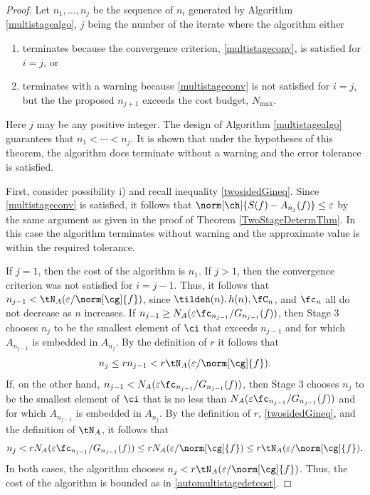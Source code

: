 \documentclass[]{elsarticle}
\theoremstyle{definition}
\theoremstyle{remark}
\begin{document}
\begin{proof} Let $n_1, \ldots, n_{j}$ be the sequence of $n_i$ generated by Algorithm \ref{multistagealgo}, $j$ being the number of the iterate where the algorithm either 
\begin{enumerate}
\renewcommand{\labelenumi}{\roman{enumi})}
\item terminates because the convergence criterion, \eqref{multistageconv}, is satisfied for $i=j$, or 

\item terminates with a warning because \eqref{multistageconv} is not satisfied for $i=j$, but the the proposed $n_{j+1}$ exceeds the cost budget, $N_{\max}$. 

\end{enumerate}
Here $j$ may be any positive integer.  The design of Algorithm \ref{multistagealgo} guarantees that $n_1 < \cdots < n_j$.  It is shown that under the hypotheses of this theorem, the algorithm does terminate without a warning and the error tolerance is satisfied.  

First, consider possibility i) and recall inequality \eqref{twosidedGineq}.
Since \eqref{multistageconv} is satisfied, it follows that $\norm[\ch]{S(f)-A_{n_j}(f)} \le \varepsilon$ by the same argument as given in the proof of Theorem \ref{TwoStageDetermThm}.  In this case the algorithm terminates without warning and the approximate value is within the required tolerance.

If $j=1$, then the cost of the algorithm is $n_1$.  If $j>1$, then the convergence criterion was not satisfied for $i=j-1$. Thus, it follows that $n_{j-1} < \tN_A(\varepsilon/\norm[\cg]{f})$, since $\tildeh(n), h(n), \fC_n$, and $\fc_n$ all do not decrease as $n$ increases. 
If $n_{j-1} \ge N_{A}(\varepsilon \fc_{n_{j-1}}/G_{n_{j-1}}(f))$, then Stage 3 chooses $n_{j}$ to be the smallest element of $\ci$ that exceeds $n_{j-1}$ and for which $A_{n_{j-1}}$ is embedded in $A_{n_j}$.  By the definition of $r$ it follows that
\begin{equation*}
n_{j} \le r  n_{j-1} < r \tN_{A}(\varepsilon/\norm[\cg]{f}).
\end{equation*}
If, on the other hand, $n_{j-1} < N_{A}(\varepsilon \fc_{n_{j-1}}/G_{n_{j-1}}(f))$, then Stage 3 chooses $n_{j}$ to be the smallest element of $\ci$ that is no less than $N_{A}(\varepsilon \fc_{n_{j-1}}/G_{n_{j-1}}(f))$ and for which $A_{n_{j-1}}$ is embedded in $A_{n_j}$.  By the definition of $r$, \eqref{twosidedGineq}, and the definition of $\tN_A$, it follows that
\begin{equation*}
n_{j} < r  N_{A}(\varepsilon \fc_{n_{j-1}}/G_{n_{j-1}}(f)) \le r  N_{A}(\varepsilon/\norm[\cg]{f}) \le r \tN_{A}(\varepsilon/\norm[\cg]{f}).
\end{equation*}
In both cases, the algorithm chooses $n_{j} < r \tN_{A}(\varepsilon/\norm[\cg]{f})$.  Thus, the cost of the algorithm is bounded as in \eqref{automultistagedetcost}.


\end{proof}
\end{document}
